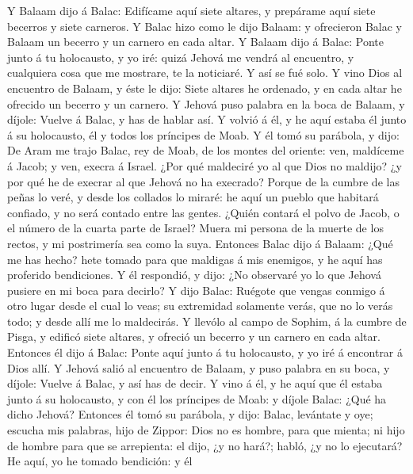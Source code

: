  Y Balaam dijo á Balac: Edifícame aquí siete altares, y
prepárame aquí siete becerros y siete carneros.  Y Balac
hizo como le dijo Balaam: y ofrecieron Balac y Balaam un becerro y un
carnero en cada altar.  Y Balaam dijo á Balac: Ponte junto
á tu holocausto, y yo iré: quizá Jehová me vendrá al encuentro, y
cualquiera cosa que me mostrare, te la noticiaré. Y así se fué solo.
 Y vino Dios al encuentro de Balaam, y éste le dijo: Siete
altares he ordenado, y en cada altar he ofrecido un becerro y un
carnero.  Y Jehová puso palabra en la boca de Balaam, y
díjole: Vuelve á Balac, y has de hablar así.  Y volvió á
él, y he aquí estaba él junto á su holocausto, él y todos los príncipes
de Moab.  Y él tomó su parábola, y dijo: De Aram me trajo
Balac, rey de Moab, de los montes del oriente: ven, maldíceme á Jacob; y
ven, execra á Israel.  ¿Por qué maldeciré yo al que Dios
no maldijo? ¿y por qué he de execrar al que Jehová no ha execrado?
 Porque de la cumbre de las peñas lo veré, y desde los
collados lo miraré: he aquí un pueblo que habitará confiado, y no será
contado entre las gentes.  ¿Quién contará el polvo de
Jacob, o el número de la cuarta parte de Israel? Muera mi persona de la
muerte de los rectos, y mi postrimería sea como la suya. 
Entonces Balac dijo á Balaam: ¿Qué me has hecho? hete tomado para que
maldigas á mis enemigos, y he aquí has proferido bendiciones.
 Y él respondió, y dijo: ¿No observaré yo lo que Jehová
pusiere en mi boca para decirlo?  Y dijo Balac: Ruégote
que vengas conmigo á otro lugar desde el cual lo veas; su extremidad
solamente verás, que no lo verás todo; y desde allí me lo maldecirás.
 Y llevólo al campo de Sophim, á la cumbre de Pisga, y
edificó siete altares, y ofreció un becerro y un carnero en cada altar.
 Entonces él dijo á Balac: Ponte aquí junto á tu
holocausto, y yo iré á encontrar á Dios allí.  Y Jehová
salió al encuentro de Balaam, y puso palabra en su boca, y díjole:
Vuelve á Balac, y así has de decir.  Y vino á él, y he
aquí que él estaba junto á su holocausto, y con él los príncipes de
Moab: y díjole Balac: ¿Qué ha dicho Jehová?  Entonces él
tomó su parábola, y dijo: Balac, levántate y oye; escucha mis palabras,
hijo de Zippor:  Dios no es hombre, para que mienta; ni
hijo de hombre para que se arrepienta: el dijo, ¿y no hará?; habló, ¿y
no lo ejecutará?  He aquí, yo he tomado bendición: y él
